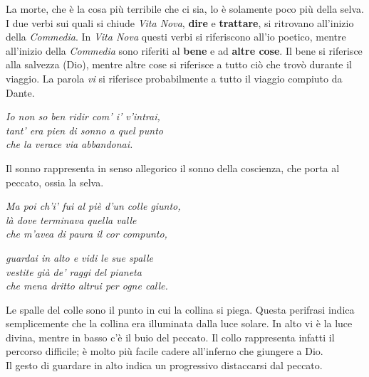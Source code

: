 \documentclass[a4paper]{article}
\begin{document}
La morte, che è la cosa più terribile che ci sia, lo è solamente poco più della selva.
\\
I due verbi sui quali si chiude \textit{Vita Nova},
\textbf{dire} e \textbf{trattare}, si ritrovano all'inizio della \textit{Commedia}.
In \textit{Vita Nova} questi verbi si riferiscono all'io poetico, mentre all'inizio della \textit{Commedia}
sono riferiti al \textbf{bene} e ad \textbf{altre cose}.
Il bene si riferisce alla salvezza (Dio), mentre altre cose si riferisce a tutto ciò che trovò durante il viaggio.
La parola \textit{vi} si riferisce probabilmente a tutto il viaggio compiuto da Dante.

\begin{center}
    \textit{Io non so ben ridir com' i' v'intrai,} \\
    \textit{tant' era pien di sonno a quel punto} \\
    \textit{che la verace via abbandonai.}
\end{center}

Il sonno rappresenta in senso allegorico il sonno della coscienza, che porta al peccato, ossia la selva.


\begin{center}
    \textit{Ma poi ch'i' fui al piè d'un colle giunto,} \\
    \textit{là dove terminava quella valle} \\
    \textit{che m'avea di paura il cor compunto,}
\end{center}

\begin{center}
    \textit{guardai in alto e vidi le sue spalle} \\
    \textit{vestite già de' raggi del pianeta} \\
    \textit{che mena dritto altrui per ogne calle.}
\end{center}

Le spalle del colle sono il punto in cui la collina si piega.
Questa perifrasi indica semplicemente che la collina era illuminata dalla luce solare.
In alto vi è la luce divina, mentre in basso c'è il buio del peccato.
Il collo rappresenta infatti il percorso difficile; è molto più facile
cadere all'inferno che giungere a Dio. \\
Il gesto di guardare in alto indica un progressivo distaccarsi dal peccato.
\end{document}

